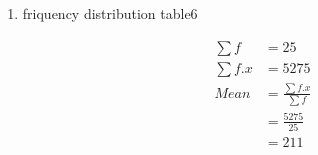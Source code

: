 \renewcommand{\theequation}{\theenumi}
\begin{enumerate}[label=\arabic*.,ref=\thesubsection.\theenumi]
\item\begin{table}[!ht]
	\centering
	
	\caption{friquency distribution table6 }
\end{table}
\begin{align}
\sum{f} &= 25
\\
\sum{f.x} &= 5275
\\
Mean &= \frac{\sum{f.x}}{\sum{f}}
\\ &= \frac{5275}{25}
\\&= 211
\end{align}
\end{enumerate}
